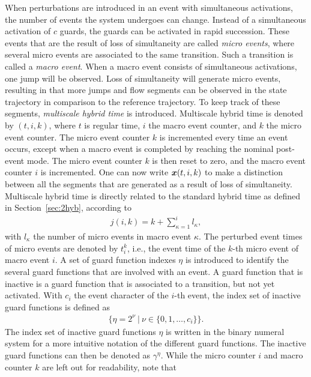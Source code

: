 \documentclass[../DC2019003Bouma.tex]{subfiles}
\begin{document}
When perturbations are introduced in an event with simultaneous activations, the number of events the system undergoes can change. Instead of a simultaneous activation of $c$ guards, the guards can be activated in rapid succession. These events that are the result of loss of simultaneity are called \textit{micro events}, where several micro events are associated to the same transition. Such a transition is called a \textit{macro event}. When a macro event consists of simultaneous activations, one jump will be observed. Loss of simultaneity will generate micro events, resulting in that more jumps and flow segments can be observed in the state trajectory in comparison to the reference trajectory. To keep track of these segments, \textit{multiscale hybrid time} is introduced. Multiscale hybrid time is denoted by $(t,i,k)$, where $t$ is regular time, $i$ the macro event counter, and $k$ the micro event counter. The micro event counter $k$ is incremented every time an event occurs, except when a macro event is completed by reaching the nominal post-event mode. The micro event counter $k$ is then reset to zero, and the macro event counter $i$ is incremented. One can now write ${\boldsymbol{x}}(t,i,k)$ to make a distinction between all the segments that are generated as a result of loss of simultaneity. Multiscale hybrid time is directly related to the standard hybrid time as defined in Section~\ref{sec:2hyb}, according to
\begin{align}
j(i,k) = k + \sum_{\kappa=1}^{i}l_\kappa,
\end{align}
with $l_\kappa$ the number of micro events in macro event $\kappa$. The perturbed event times of micro events are denoted by $t^k_i$, i.e., the event time of the $k$-th micro event of macro event $i$. A set of guard function indexes $\eta$ is introduced to identify the several guard functions that are involved with an event. A guard function that is inactive is a guard function that is associated to a transition, but not yet activated. With $c_i$ the event character of the $i$-th event, the index set of inactive guard functions is defined as
\begin{align}
\big\{\eta = 2^{\nu}\ |\ \nu\in\{0,1,\dots,c_i\}\big\}.\label{eq:4eta}
\end{align}
The index set of inactive guard functions $\eta$ is written in the binary numeral system for a more intuitive notation of the different guard functions. The inactive guard functions can then be denoted as $\gamma^\eta$. While the micro counter $i$ and macro counter $k$ are left out for readability, note that
\end{document}
